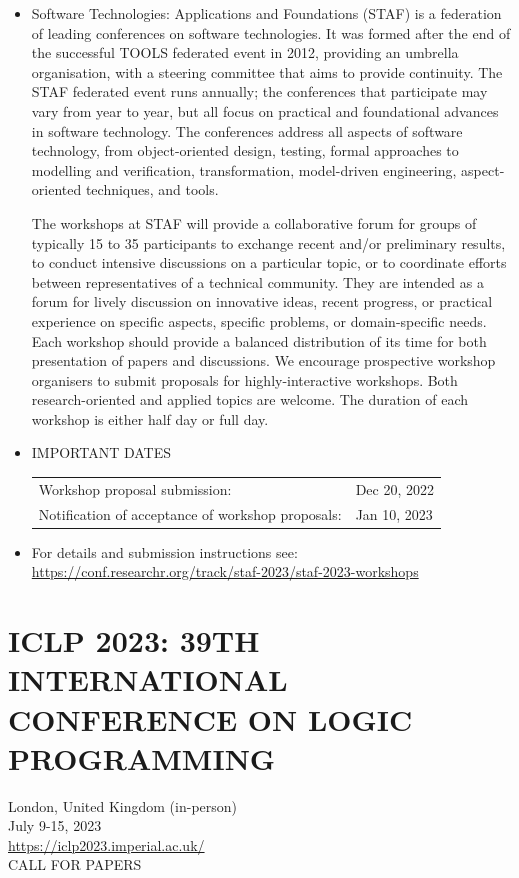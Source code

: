 \documentclass[prodmode,acmtecs]{acmsmall} %
\begin{document}
\begin{itemize}\item   Software Technologies: Applications and Foundations (STAF) is a federation of leading conferences on software technologies. It was formed after the end of the successful TOOLS federated event in 2012, providing an umbrella organisation, with a steering committee that aims to provide continuity. The STAF federated event runs annually; the conferences that participate may vary from year to year, but all focus on practical and foundational advances in software technology. The conferences address all aspects of software technology, from object-oriented design, testing, formal approaches to modelling and verification, transformation, model-driven engineering, aspect-oriented techniques, and tools. 
 
  The workshops at STAF will provide a collaborative forum for groups of typically 15 to 35 participants to exchange recent and/or preliminary results, to conduct intensive discussions on a particular topic, or to coordinate efforts between representatives of a technical community. They are intended as a forum for lively discussion on innovative ideas, recent progress, or practical experience on specific aspects, specific problems, or domain-specific needs. Each workshop should provide a balanced distribution of its time for both presentation of papers and discussions. We encourage prospective workshop organisers to submit proposals for highly-interactive workshops. Both research-oriented and applied topics are welcome. The duration of each workshop is either half day or full day. 
 
\item  IMPORTANT DATES 
 
\begin{tabulary}{\linewidth}{LL}Workshop proposal submission:  & Dec 20, 2022 \\
Notification of acceptance of workshop proposals:  & Jan 10, 2023 \\
\end{tabulary}
 
\item  For details and submission instructions see:  \href{https://conf.researchr.org/track/staf-2023/staf-2023-workshops}{https://conf.researchr.org/track/staf-2023/staf-2023-workshops} 
 
\end{itemize}\section{ICLP 2023: 39TH INTERNATIONAL CONFERENCE ON LOGIC PROGRAMMING}\label{ICLP2023}  London, United Kingdom (in-person)\\ 
  July 9-15, 2023\\ 
  \href{https://iclp2023.imperial.ac.uk/}{https://iclp2023.imperial.ac.uk/} \\ 
CALL FOR PAPERS 
\end{document}
